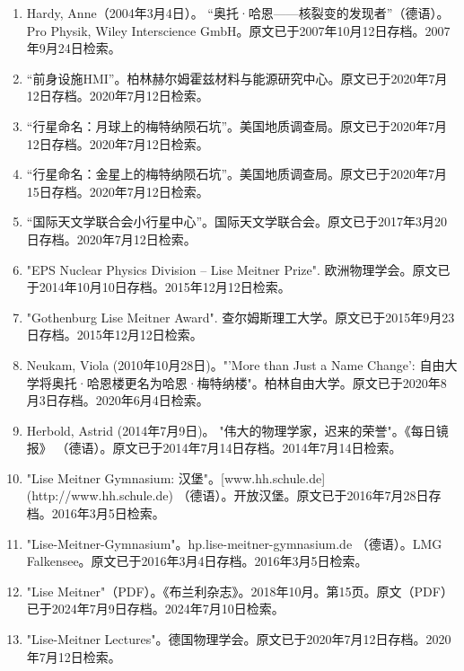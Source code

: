 \begin{enumerate}
\item Hardy, Anne（2004年3月4日）。 “奥托·哈恩——核裂变的发现者”（德语）。Pro Physik, Wiley Interscience GmbH。原文已于2007年10月12日存档。2007年9月24日检索。
\item “前身设施HMI”。柏林赫尔姆霍兹材料与能源研究中心。原文已于2020年7月12日存档。2020年7月12日检索。
\item “行星命名：月球上的梅特纳陨石坑”。美国地质调查局。原文已于2020年7月12日存档。2020年7月12日检索。
\item “行星命名：金星上的梅特纳陨石坑”。美国地质调查局。原文已于2020年7月15日存档。2020年7月12日检索。
\item “国际天文学联合会小行星中心”。国际天文学联合会。原文已于2017年3月20日存档。2020年7月12日检索。
\item "EPS Nuclear Physics Division – Lise Meitner Prize". 欧洲物理学会。原文已于2014年10月10日存档。2015年12月12日检索。
\item "Gothenburg Lise Meitner Award". 查尔姆斯理工大学。原文已于2015年9月23日存档。2015年12月12日检索。
\item Neukam, Viola (2010年10月28日)。"'More than Just a Name Change': 自由大学将奥托·哈恩楼更名为哈恩·梅特纳楼"。柏林自由大学。原文已于2020年8月3日存档。2020年6月4日检索。
\item Herbold, Astrid (2014年7月9日)。 "伟大的物理学家，迟来的荣誉"。《每日镜报》 （德语）。原文已于2014年7月14日存档。2014年7月14日检索。
\item "Lise Meitner Gymnasium: 汉堡"。[www.hh.schule.de](http://www.hh.schule.de) （德语）。开放汉堡。原文已于2016年7月28日存档。2016年3月5日检索。
\item "Lise-Meitner-Gymnasium"。hp.lise-meitner-gymnasium.de （德语）。LMG Falkensee。原文已于2016年3月4日存档。2016年3月5日检索。
\item "Lise Meitner"（PDF）。《布兰利杂志》。2018年10月。第15页。原文（PDF）已于2024年7月9日存档。2024年7月10日检索。
\item "Lise-Meitner Lectures"。德国物理学会。原文已于2020年7月12日存档。2020年7月12日检索。


\end{enumerate}